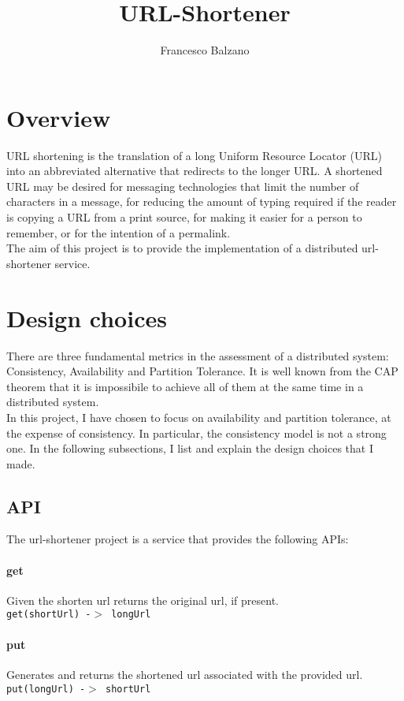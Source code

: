 \documentclass{article}
\title{URL-Shortener}
\author{Francesco Balzano}
\begin{document}
  \maketitle
  \newpage
  \tableofcontents
  \newpage
  
\section{Overview}  
URL shortening is the translation of a long Uniform Resource Locator (URL) into an abbreviated alternative that redirects to the longer URL.  A shortened URL may be desired for messaging technologies that limit the number of characters in a message, for reducing the amount of typing required if the reader is copying a URL from a print source, for making it easier for a person to remember, or for the intention of a permalink.\\  
The aim of this project is to provide the implementation of a distributed url-shortener service.


\section{Design choices}
There are three fundamental metrics in the assessment of a distributed system: Consistency, Availability and Partition Tolerance. It is well known from the CAP theorem that it is impossibile to achieve all of them at the same time in a distributed system. \\ 
In this project, I have chosen to focus on availability and partition tolerance, at the expense of consistency. In particular, the consistency model is not a strong one.
In the following subsections, I list and explain the design choices that I made.


\subsection{API}
The url-shortener project is a service that provides the following APIs:

\paragraph{get}
Given the shorten url returns the original url, if present. \\
\texttt{get(shortUrl) -$>$ longUrl}

\paragraph{put}
Generates and returns the shortened url associated with the provided url. \\
\texttt{put(longUrl) -$>$  shortUrl}
\end{document}

